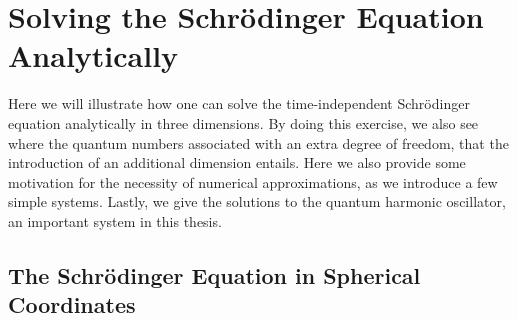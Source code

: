 \chapter{Solving the Schrödinger Equation Analytically}
\label{app:analytical_tise}

Here we will illustrate how one can solve the time-independent Schrödinger
equation analytically in three dimensions. By doing this exercise, we also see
where the quantum numbers associated with an extra degree of freedom, that the
introduction of an additional dimension entails. Here we also provide some 
motivation for the necessity of numerical approximations, as we introduce a 
few simple systems. Lastly, we give the solutions to the quantum harmonic 
oscillator, an important system in this thesis.

\section{The Schrödinger Equation in Spherical Coordinates}

